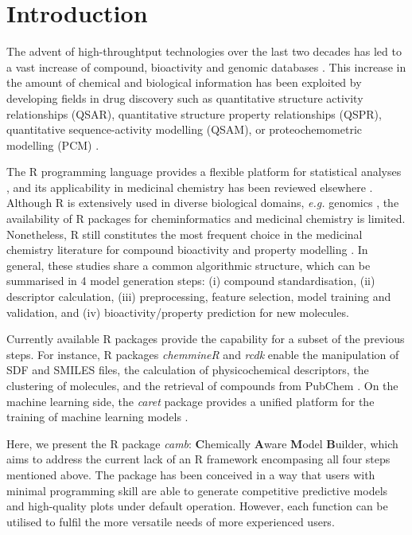 \documentclass{bioinfo}
\begin{document}
\section{Introduction}

The advent of high-throughtput technologies over the last two decades 
has led to a vast increase of compound, bioactivity
and genomic databases \citep{bender_databases,chembl,pubchem}.
This increase in the amount of chemical and biological information 
has been exploited by developing fields in drug discovery 
such as quantitative structure activity relationships (QSAR), quantitative structure property relationships (QSPR), quantitative sequence-activity modelling (QSAM), or proteochemometric modelling (PCM) \citep{review_pcm}.

The R programming language provides a flexible platform for statistical analyses \citep{Rlanguage},
and its applicability in medicinal chemistry has been reviewed elsewhere \citep{mente}.
Although R is extensively used in diverse biological domains, {\it e.g.} genomics \citep{bioconductor},
the availability of R packages for cheminformatics and medicinal chemistry is limited. %
Nonetheless, R still constitutes the most frequent choice in the medicinal chemistry literature
for compound bioactivity and property modelling \citep{mente}.
In general, these studies share a common algorithmic structure, which can be summarised in 4 model generation steps:
(i) compound standardisation, (ii) descriptor calculation,
(iii) preprocessing, feature selection, model training and validation, and (iv) bioactivity/property prediction for new molecules.

Currently available R packages provide the capability for a subset of the previous steps.
For instance, R packages {\it chemmineR} \citep{chemmineR} and {\it rcdk} \citep{rcdk} enable the manipulation of SDF and SMILES
files, the calculation of physicochemical descriptors, the clustering of molecules,
and the retrieval of compounds from PubChem \citep{pubchem}.
On the machine learning side, the {\it caret} package provides a
unified platform for the training of machine learning models \citep{caret}.

Here, we present the R package {\it camb}: {\bf C}hemically {\bf A}ware {\bf M}odel {\bf B}uilder,
which aims to address the current lack of an R framework encompasing all four steps mentioned above.
The package has been conceived in a way that users with minimal
programming skill are able to generate competitive predictive models and high-quality plots
under default operation.
However, each function can be utilised to fulfil the more versatile needs of more experienced users.
\end{document}
